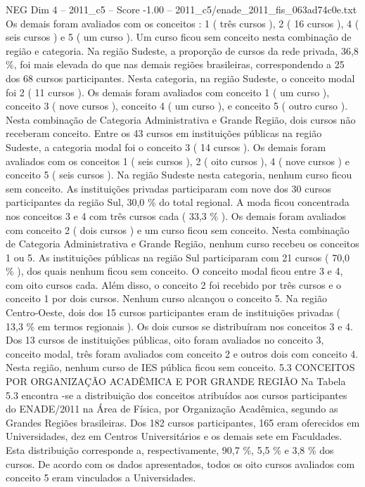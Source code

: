 \begin{textsample}{NEG Dim 4 – 2011\_c5 – Score -1.00 – 2011\_c5/enade\_2011\_fis\_063ad74c0e.txt}
Os demais foram avaliados com os conceitos : 1 ( três cursos ), 2 ( 16 cursos ), 4 ( seis cursos ) e 5 ( um curso ).
Um curso ficou sem conceito nesta combinação de região e categoria.
Na região Sudeste, a proporção de cursos da rede privada, 36,8 \%, foi mais elevada do que nas demais regiões brasileiras, correspondendo a 25 dos 68 cursos participantes.
Nesta categoria, na região Sudeste, o conceito modal foi 2 ( 11 cursos ).
Os demais foram avaliados com conceito 1 ( um curso ), conceito 3 ( nove cursos ), conceito 4 ( um curso ), e conceito 5 ( outro curso ).
Nesta combinação de Categoria Administrativa e Grande Região, dois cursos não receberam conceito.
Entre os 43 cursos em instituições públicas na região Sudeste, a categoria modal foi o conceito 3 ( 14 cursos ).
Os demais foram avaliados com os conceitos 1 ( seis cursos ), 2 ( oito cursos ), 4 ( nove cursos ) e conceito 5 ( seis cursos ).
Na região Sudeste nesta categoria, nenhum curso ficou sem conceito.
As instituições privadas participaram com nove dos 30 cursos participantes da região Sul, 30,0 \% do total regional.
A moda ficou concentrada nos conceitos 3 e 4 com três cursos cada ( 33,3 \% ).
Os demais foram avaliados com conceito 2 ( dois cursos ) e um curso ficou sem conceito.
Nesta combinação de Categoria Administrativa e Grande Região, nenhum curso recebeu os conceitos 1 ou 5.
As instituições públicas na região Sul participaram com 21 cursos ( 70,0 \% ), dos quais nenhum ficou sem conceito.
O conceito modal ficou entre 3 e 4, com oito cursos cada.
Além disso, o conceito 2 foi recebido por três cursos e o conceito 1 por dois cursos.
Nenhum curso alcançou o conceito 5.
Na região Centro-Oeste, dois dos 15 cursos participantes eram de instituições privadas ( 13,3 \% em termos regionais ).
Os dois cursos se distribuíram nos conceitos 3 e 4.
Dos 13 cursos de instituições públicas, oito foram avaliados no conceito 3, conceito modal, três foram avaliados com conceito 2 e outros dois com conceito 4.
Nesta região, nenhum curso de IES pública ficou sem conceito. 5.3 CONCEITOS POR ORGANIZAÇÃO ACADÊMICA E POR GRANDE REGIÃO Na Tabela 5.3 encontra -se a distribuição dos conceitos atribuídos aos cursos participantes do ENADE/2011 na Área de Física, por Organização Acadêmica, segundo as Grandes Regiões brasileiras.
Dos 182 cursos participantes, 165 eram oferecidos em Universidades, dez em Centros Universitários e os demais sete em Faculdades.
Esta distribuição corresponde a, respectivamente, 90,7 \%, 5,5 \% e 3,8 \% dos cursos.
De acordo com os dados apresentados, todos os oito cursos avaliados com conceito 5 eram vinculados a Universidades.

\end{textsample}
